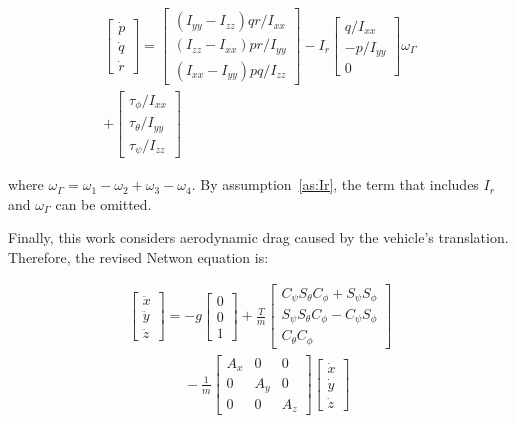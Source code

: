 \documentclass[letterpaper, 10 pt, conference]{ieeeconf}  %
\begin{document}
 $$
 \begin{array}{c}
 \left[ \begin{array}{c}{\dot{p}} \\ {\dot{q}} \\ {\dot{r}}\end{array}\right]= 
 \left[ \begin{array}{c}{\left(I_{y y}-I_{z z}\right) q r / I_{x x}} \\ {\left(I_{z z}-I_{x x}\right) p r / I_{y y}} \\ {(I_{x x}-I_{y y}) p q / I_{z z}}\end{array}\right] 
 - I_{r} \left[ \begin{array}{c}{q / I_{x x}} \\ {-p / I_{y y}} \\ {0}\end{array}\right] \omega_{\Gamma} \\
 + \left[ \begin{array}{c}{\tau_{\phi} / I_{x x}} \\ {\tau_{\theta} / I_{y y}} \\ {\tau_{\psi} / I_{z z}}\end{array}\right]
 \end{array}
 $$
 
 where $\omega_\Gamma = \omega_1 - \omega_2 + \omega_3 - \omega_4$. By assumption~\ref{as:Ir}, the term that includes $I_r$ and $\omega_\Gamma$ can be omitted.
 
 Finally, this work considers aerodynamic drag caused by the vehicle's translation. Therefore, the revised Netwon equation is:
 
  $$
  \begin{array}{l}
  \left[ \begin{array}{l}{\ddot{x}} \\ {\ddot{y}} \\ {\ddot{z}}\end{array}\right]=-g \left[ \begin{array}{l}{0} \\ {0} \\ {1}\end{array}\right]+\frac{T}{m} \left[ \begin{array}{c}{C_{\psi} S_{\theta} C_{\phi}+S_{\psi} S_{\phi}} \\ {S_{\psi} S_{\theta} C_{\phi}-C_{\psi} S_{\phi}} \\ {C_{\theta} C_{\phi}}\end{array}\right] \\
  \quad \quad \quad \quad  - \frac{1}{m} \left[ \begin{array}{ccc}{A_{x}} & {0} & {0} \\ {0} & {A_{y}} & {0} \\ {0} & {0} & {A_{z}}\end{array}\right] \left[ \begin{array}{c}{\dot{x}} \\ {\dot{y}} \\ {\dot{z}}\end{array}\right]
  \end{array}
  $$
  
\end{document}
